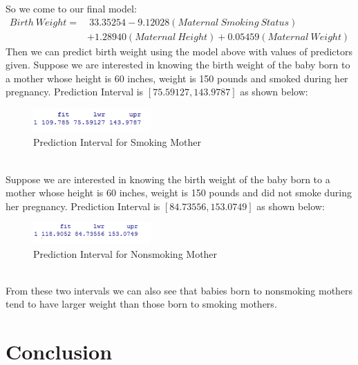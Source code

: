 \documentclass[oneside,12pt]{report}
\begin{document}
So we come to our final model:
\[
\begin{split}
     Birth~Weight=&~33.35254 - 9.12028 (Maternal~Smoking~Status)\\ 
                  &+ 1.28940 (Maternal~Height) + 0.05459(Maternal~Weight)
\end{split}
\]
\indent Then we can predict birth weight using the model above with values of predictors given. Suppose we are interested in knowing the birth weight of the baby born to a mother whose height is 60 inches, weight is 150 pounds and smoked during her pregnancy. Prediction Interval is $[75.59127, 143.9787]$ as shown below:\\
\begin{figure}[htb]
    \begin{center}
        \includegraphics[width=0.4\textwidth]{predict1.png}
    \end{center}
    \caption{Prediction Interval for Smoking Mother}
    \label{predict1}
\end{figure}\\
\indent Suppose we are interested in knowing the birth weight of the baby born to a mother whose height is 60 inches, weight is 150 pounds and did not smoke during her pregnancy. Prediction Interval is $[84.73556, 153.0749]$ as shown below:\\
\begin{figure}[htb]
    \begin{center}
        \includegraphics[width=0.4\textwidth]{predict2.png}
    \end{center}
    \caption{Prediction Interval for Nonsmoking Mother}
    \label{predict2}
\end{figure}\\
\indent From these two intervals we can also see that babies born to nonsmoking mothers tend to have larger weight than those born to smoking mothers.


%
\chapter{Conclusion}\label{Conclusion}
\end{document}
